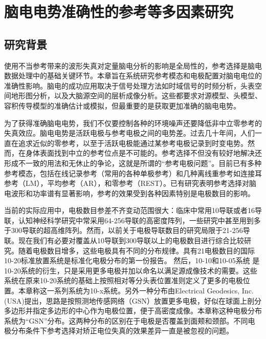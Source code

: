 \chapter{脑电电势准确性的参考等多因素研究}
\section{研究背景}
使用不当参考带来的波形失真对定量脑电分析的影响是全局性的，参考选择是脑电数据处理中的基础关键环节。本章旨在系统研究参考模态和电极配置对脑电电位的准确性影响。脑电的成功应用取决于信号处理方法如时域信号的时频分析，头表空间地形图分析，以及大脑源空间的层析成像分析。这些都要求对源模型、头模型、容积传导模型的准确估计或模拟，但最重要的是获取更加准确的脑电电势。

为了获得准确脑电电势，我们不仅要控制各种的环境噪声还要降低非中立零参考的失真效应。脑电电势是活跃电极与参考电极之间的电势差。过去几十年间，人们一直在追求近似的零参考，以至于活跃电极能通过某参考电极记录到时变电势。然而，在身体表面找到中立的参考位点是不可能的。参考选择不但没有较好地解决还形成不一致的用法和无休止的争论，这就是所谓的“参考电极问题”。目前已有多种参考模态，包括在线记录参考（常用的各种单极参考）和几种离线重参考如连接耳参考（LM），平均参考（AR），和零参考（REST）。已有研究表明参考选择对脑电波形和功率谱有显著影响，参考的效果受到各种因素特别是电极数目的影响。

当前的实际应用中，电极数目参差不齐变动范围很大：临床中常用10导联或者16导联，认知神经科学研究中常采用64-256导联的高密度阵列，一些研究中甚至用到多于300导联的超高维阵列。然而，以前关于电极导联数目的研究局限于21-256导联。现在我们有必要对覆盖从10导联到300导联以上的电极数目进行综合比较研究。随着电极数目增多，这些电极具有不同的分布规律。具有21电极数目的国际10-20标准放置系统是标准化电极分布的第一份报告。 然后，10-10和10-05系统
是10-20系统的衍生，只是采用更多电极并加以命名以满足源成像技术的需要。这些系统在原来10-20系统的基础上按照相对等分头表位置准则定义了更多的电极位置。本章称这一系列系统为10-x系统。另外一种分布由Electrical Geodesics, Inc.(USA)提出，思路是按照测地传感网络（GSN）放置更多电极，好似在球面上剖分多边形并指定多边形的中心作为电极位置，便于高密度成像。本章称这种电极分布系统为“GSN”分布。这两种分布的区别在于电极是否覆盖到面颊和颈部。不同电极分布条件下参考选择对矫正电位失真的效果差异一直是被忽视的问题。


